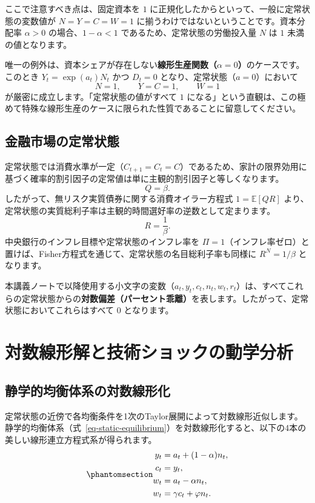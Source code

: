 \documentclass[
  japanese,
  lualatex,
  ja=standard,
  12pt,
  a4paper]{ltjsarticle}
\begin{document}
ここで注意すべき点は、固定資本を \(1\)
に正規化したからといって、一般に定常状態の変数値が \(N = Y = C = W = 1\)
に揃うわけではないということです。資本分配率 \(\alpha > 0\)
の場合、\(1-\alpha < 1\) であるため、定常状態の労働投入量 \(N\) は \(1\)
未満の値となります。

唯一の例外は、資本シェアが存在しない\textbf{線形生産関数（\(\alpha = 0\)）}のケースです。このとき
\(Y_t = \exp(a_t) N_t\) かつ \(D_t = 0\)
となり、定常状態（\(a=0\)）において \[
N = 1, \qquad Y = C = 1, \qquad W = 1
\] が厳密に成立します。「定常状態の値がすべて \(1\)
になる」という直観は、この極めて特殊な線形生産のケースに限られた性質であることに留意してください。

\subsection{金融市場の定常状態}\label{ux91d1ux878dux5e02ux5834ux306eux5b9aux5e38ux72b6ux614b}

定常状態では消費水準が一定（\(C_{t+1} = C_t = C\)）であるため、家計の限界効用に基づく確率的割引因子の定常値は単に主観的割引因子と等しくなります。
\[
Q = \beta.
\] したがって、無リスク実質債券に関する消費オイラー方程式
\(1 = \mathbb{E}[Q R]\)
より、定常状態の実質総利子率は主観的時間選好率の逆数として定まります。
\[
R = \frac{1}{\beta}.
\] 中央銀行のインフレ目標や定常状態のインフレ率を
\(\Pi = 1\)（インフレ率ゼロ）と置けば、Fisher方程式を通じて、定常状態の名目総利子率も同様に
\(R^N = 1/\beta\) となります。

本講義ノートで以降使用する小文字の変数（\(a_t, y_t, c_t, n_t, w_t, r_t\)）は、すべてこれらの定常状態からの\textbf{対数偏差（パーセント乖離）}を表します。したがって、定常状態においてこれらはすべて
\(0\) となります。

\section{対数線形解と技術ショックの動学分析}\label{ux5bfeux6570ux7ddaux5f62ux89e3ux3068ux6280ux8853ux30b7ux30e7ux30c3ux30afux306eux52d5ux5b66ux5206ux6790}

\subsection{静学的均衡体系の対数線形化}\label{ux9759ux5b66ux7684ux5747ux8861ux4f53ux7cfbux306eux5bfeux6570ux7ddaux5f62ux5316}

定常状態の近傍で各均衡条件を1次のTaylor展開によって対数線形近似します。静学的均衡体系（式~\ref{eq-static-equilibrium}）を対数線形化すると、以下の4本の美しい線形連立方程式系が得られます。
\begin{equation}\protect\phantomsection\label{eq-loglinear-system}{
\begin{aligned}
y_t &= a_t + (1-\alpha) n_t,\\
c_t &= y_t,\\
w_t &= a_t - \alpha n_t,\\
w_t &= \gamma c_t + \varphi n_t.
\end{aligned}
}\end{equation}
\end{document}
